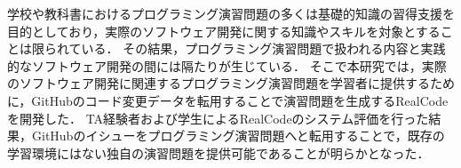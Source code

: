 \begin{abstractja}
学校や教科書におけるプログラミング演習問題の多くは基礎的知識の習得支援を目的としており，実際のソフトウェア開発に関する知識やスキルを対象とすることは限られている．
その結果，プログラミング演習問題で扱われる内容と実践的なソフトウェア開発の間には隔たりが生じている．
そこで本研究では，実際のソフトウェア開発に関連するプログラミング演習問題を学習者に提供するために，GitHubのコード変更データを転用することで演習問題を生成するRealCodeを開発した．
TA経験者および学生によるRealCodeのシステム評価を行った結果，GitHubのイシューをプログラミング演習問題へと転用することで，既存の学習環境にはない独自の演習問題を提供可能であることが明らかとなった．
\end{abstractja}